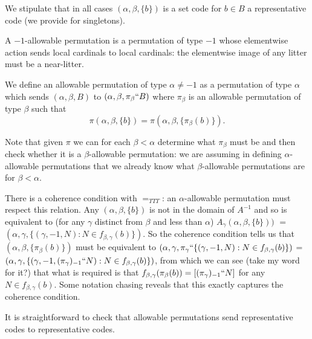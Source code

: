 \documentclass{slides}
\begin{document}
\begin{slide}

We stipulate that in all cases $(\alpha,\beta,\{b\})$ is a set code for $b \in B$ a representative code (we provide for singletons).

A $-1$-allowable permutation is a permutation of type $-1$ whose elementwise action sends local cardinals to local cardinals:  the elementwise image of any litter must be a near-litter.

We define an allowable permutation of type $\alpha\neq -1$ as a permutation of type $\alpha$ which sends
$(\alpha,\beta,B)$ to $(\alpha,\beta,\pi_\beta``B)$ where $\pi_\beta$ is an allowable permutation of type $\beta$
such that $$\pi(\alpha,\beta,\{b\}) = \pi(\alpha,\beta,\{\pi_\beta(b)\}).$$

Note that given $\pi$ we can for each $\beta<\alpha$ determine what $\pi_\beta$ must be and then check whether it is a $\beta$-allowable permutation:  we are assuming in defining $\alpha$-allowable permutations that we already know what $\beta$-allowable permutations are for $\beta<\alpha$.

There is a coherence condition with $=_{TTT}$:  an $\alpha$-allowable permutation must respect this relation.
Any $(\alpha,\beta,\{b\})$ is not in the domain of $A^{-1}$ and so is equivalent to (for any $\gamma$ distinct from $\beta$ and less than $\alpha$) $A_\gamma(\alpha,\beta,\{b\}))$ $=$ $(\alpha,\gamma,\{(\gamma,-1,N):N \in f_{\beta,\gamma}(b)\})$.  So the coherence condition tells us that $(\alpha,\beta,\{\pi_{\beta}(b)\})$ must be equivalent to  $(\alpha,\gamma,\pi_\gamma``\{(\gamma,-1,N):N \in f_{\beta,\gamma}(b)\})$ = $(\alpha,\gamma,\{(\gamma,-1,(\pi_{\gamma})_{-1}``N):N \in f_{\beta,\gamma}(b)\})$, from which we can see (take my word for it?) that what is required is
that $f_{\beta,\gamma}(\pi_{\beta}(b)) = [(\pi_{\gamma})_{-1}``N]$ for any $N \in f_{\beta,\gamma}(b)$.  Some notation chasing reveals that this exactly captures the coherence condition.

It is straightforward to check that allowable permutations send representative codes to representative codes.

\end{slide}
\end{document}
